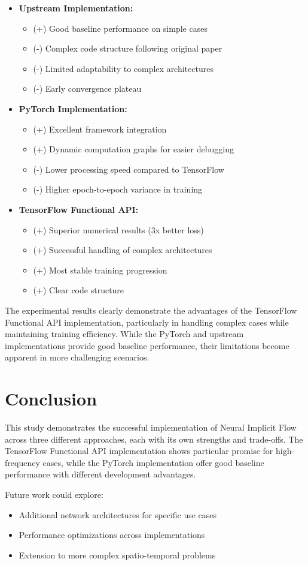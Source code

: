 \documentclass[10pt,journal,compsoc,onecolumn]{IEEEtran}
\begin{document}
\begin{itemize}
    \item \textbf{Upstream Implementation:}
    \begin{itemize}
        \item (+) Good baseline performance on simple cases
        \item (-) Complex code structure following original paper
        \item (-) Limited adaptability to complex architectures
        \item (-) Early convergence plateau
    \end{itemize}
    
    \item \textbf{PyTorch Implementation:}
    \begin{itemize}
        \item (+) Excellent framework integration
        \item (+) Dynamic computation graphs for easier debugging
        \item (-) Lower processing speed compared to TensorFlow
        \item (-) Higher epoch-to-epoch variance in training
    \end{itemize}
    
    \item \textbf{TensorFlow Functional API:}
    \begin{itemize}
        \item (+) Superior numerical results (3x better loss)
        \item (+) Successful handling of complex architectures
        \item (+) Most stable training progression
        \item (+) Clear code structure
    \end{itemize}
\end{itemize}

The experimental results clearly demonstrate the advantages of the TensorFlow Functional API implementation, particularly in handling complex cases while maintaining training efficiency. While the PyTorch and upstream implementations provide good baseline performance, their limitations become apparent in more challenging scenarios.

\section{Conclusion}
This study demonstrates the successful implementation of Neural Implicit Flow across three different approaches, each with its own strengths and trade-offs. The TensorFlow Functional API implementation shows particular promise for high-frequency cases, while the PyTorch implementation offer good baseline performance with different development advantages.

Future work could explore:
\begin{itemize}
    \item Additional network architectures for specific use cases
    \item Performance optimizations across implementations
    \item Extension to more complex spatio-temporal problems
\end{itemize}



\end{document}
